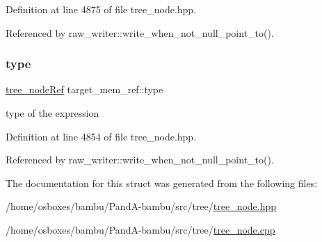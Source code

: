 Definition at line 4875 of file tree\+\_\+node.\+hpp.



Referenced by raw\+\_\+writer\+::write\+\_\+when\+\_\+not\+\_\+null\+\_\+point\+\_\+to().

\mbox{\label{structtarget__mem__ref_a8496a1b5799d861c11ae536c6e3b88ec}} 
\subsubsection{\texorpdfstring{type}{type}}
{\footnotesize\ttfamily \hyperlink{tree__node_8hpp_a6ee377554d1c4871ad66a337eaa67fd5}{tree\+\_\+node\+Ref} target\+\_\+mem\+\_\+ref\+::type}



type of the expression 



Definition at line 4854 of file tree\+\_\+node.\+hpp.



Referenced by raw\+\_\+writer\+::write\+\_\+when\+\_\+not\+\_\+null\+\_\+point\+\_\+to().



The documentation for this struct was generated from the following files\+:\begin{DoxyCompactItemize}
\item 
/home/osboxes/bambu/\+Pand\+A-\/bambu/src/tree/\hyperlink{tree__node_8hpp}{tree\+\_\+node.\+hpp}\item 
/home/osboxes/bambu/\+Pand\+A-\/bambu/src/tree/\hyperlink{tree__node_8cpp}{tree\+\_\+node.\+cpp}\end{DoxyCompactItemize}
